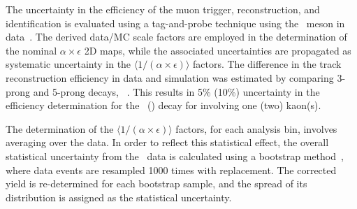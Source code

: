The uncertainty in the efficiency of the muon trigger, reconstruction, and identification is evaluated using a tag-and-probe technique using the \PJGy\ meson in data~\cite{Khachatryan:2010zg}. The derived data/MC scale factors are employed in the determination of the nominal $\alpha\!\times\!\epsilon$ 2D maps, while the associated uncertainties are propagated as systematic uncertainty in the  $\langle 1 / (\alpha\!\times\!\epsilon)\rangle$ factors.
The difference in the track reconstruction efficiency in data and simulation was estimated by comparing 3-prong and 5-prong \PDst decays, \dstardecay~\cite{Khachatryan:2016odn}. 
 This results in 5\%  (10\%) uncertainty in the efficiency determination for the \PBp\  (\PBzs) decay for involving one (two) kaon(s).

The determination of the $\langle 1 / (\alpha\!\times\!\epsilon)\rangle$ factors, for each analysis bin, involves averaging over the data. In order to reflect this statistical effect, the overall statistical uncertainty from the \PbPb\ data is calculated using a bootstrap method~\cite{bootstrap}, where data events are resampled 1000 times with replacement. The corrected yield is re-determined for each bootstrap sample, and the spread of its distribution is assigned as the statistical uncertainty.   


